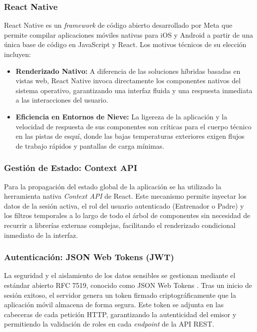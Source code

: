 \subsubsection{React Native}
React Native es un \textit{framework} de código abierto desarrollado por Meta \cite{ReactNative} que permite compilar aplicaciones móviles nativas para iOS y Android a partir de una única base de código en JavaScript y React. Los motivos técnicos de su elección incluyen:
\begin{itemize}
    \item \textbf{Renderizado Nativo:} A diferencia de las soluciones híbridas basadas en vistas web, React Native invoca directamente los componentes nativos del sistema operativo, garantizando una interfaz fluida y una respuesta inmediata a las interacciones del usuario.
    \item \textbf{Eficiencia en Entornos de Nieve:} La ligereza de la aplicación y la velocidad de respuesta de sus componentes son críticas para el cuerpo técnico en las pistas de esquí, donde las bajas temperaturas exteriores exigen flujos de trabajo rápidos y pantallas de carga mínimas.
\end{itemize}

\subsubsection{Gestión de Estado: Context API}
Para la propagación del estado global de la aplicación se ha utilizado la herramienta nativa \textit{Context API} de React. Este mecanismo permite inyectar los datos de la sesión activa, el rol del usuario autenticado (Entrenador o Padre) y los filtros temporales a lo largo de todo el árbol de componentes sin necesidad de recurrir a librerías externas complejas, facilitando el renderizado condicional inmediato de la interfaz.

\subsubsection{Autenticación: JSON Web Tokens (JWT)}
La seguridad y el aislamiento de los datos sensibles se gestionan mediante el estándar abierto RFC 7519, conocido como JSON Web Tokens \cite{RFC7519_JWT}. Tras un inicio de sesión exitoso, el servidor genera un token firmado criptográficamente que la aplicación móvil almacena de forma segura. Este token se adjunta en las cabeceras de cada petición HTTP, garantizando la autenticidad del emisor y permitiendo la validación de roles en cada \textit{endpoint} de la API REST.

